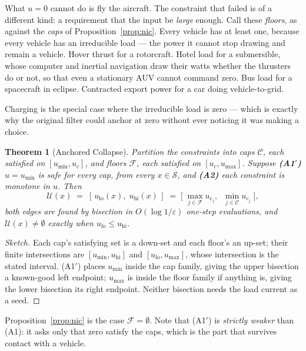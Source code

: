\documentclass[11pt,letterpaper]{article}
\newtheorem{theorem}{Theorem}
\theoremstyle{definition}
\theoremstyle{remark}
\begin{document}
What $u = 0$ cannot do is fly the aircraft. The constraint that failed is of a different kind:
a requirement that the input be \emph{large} enough. Call these \emph{floors}, as against the
\emph{caps} of Proposition~\ref{prop:nic}. Every vehicle has at least one, because every vehicle
has an irreducible load --- the power it cannot stop drawing and remain a vehicle. Hover thrust
for a rotorcraft. Hotel load for a submersible, whose computer and inertial navigation draw
their watts whether the thrusters do or not, so that even a stationary AUV cannot command zero.
Bus load for a spacecraft in eclipse. Contracted export power for a car doing vehicle-to-grid.

Charging is the special case where the irreducible load is zero --- which is exactly why the
original filter could anchor at zero without ever noticing it was making a choice.

\begin{theorem}[Anchored Collapse]\label{thm:anchored}
Partition the constraints into caps $\mathcal{C}$, each satisfied on $[u_{\min}, u_c]$, and
floors $\mathcal{F}$, each satisfied on $[u_c, u_{\max}]$. Suppose
\textbf{(A1$'$)} $u = u_{\min}$ is safe for every cap, from every $x \in \mathcal{S}$, and
\textbf{(A2)} each constraint is monotone in $u$. Then
\begin{equation}
\mathcal{U}(x) \;=\; [\,u_{\mathrm{lo}}(x),\; u_{\mathrm{hi}}(x)\,]
\;=\;\Big[\;\max_{j\in\mathcal{F}} u_{c_j},\;\; \min_{j\in\mathcal{C}} u_{c_j}\;\Big],
\end{equation}
both edges are found by bisection in $O(\log 1/\varepsilon)$ one-step evaluations, and
$\mathcal{U}(x)\neq\emptyset$ exactly when $u_{\mathrm{lo}} \le u_{\mathrm{hi}}$.
\end{theorem}

\begin{proof}[Sketch]
Each cap's satisfying set is a down-set and each floor's an up-set; their finite intersections
are $[u_{\min}, u_{\mathrm{hi}}]$ and $[u_{\mathrm{lo}}, u_{\max}]$, whose intersection is the
stated interval. (A1$'$) places $u_{\min}$ inside the cap family, giving the upper bisection a
known-good left endpoint; $u_{\max}$ is inside the floor family if anything is, giving the lower
bisection its right endpoint. Neither bisection needs the load current as a seed.
\end{proof}

Proposition~\ref{prop:nic} is the case $\mathcal{F} = \emptyset$. Note that (A1$'$) is
\emph{strictly weaker} than (A1): it asks only that zero satisfy the caps, which is the part
that survives contact with a vehicle.
\end{document}
